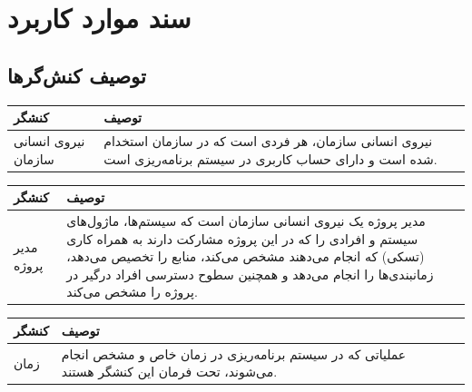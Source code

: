 
\chapter{سند موارد کاربرد}


\section{توصیف کنش‌گرها}


\begin{table}[H]
	\centering
	\begin{tabular}{|p{3cm}|p{8cm}|}
		\hline
		
		
		کنشگر	& توصیف  \\
		\hline
		
		نیروی انسانی سازمان &
		
		نیروی انسانی سازمان، هر فردی است که در سازمان استخدام شده است و دارای حساب کاربری در سیستم برنامه‌ریزی است.\\
		
		\hline
		
	\end{tabular}
\end{table}

\begin{table}[H]
	\centering
	\begin{tabular}{|p{3cm}|p{8cm}|}
		\hline
		
		
		کنشگر	& توصیف  \\
		\hline
		مدیر پروژه &
		
		مدیر پروژه یک نیروی انسانی سازمان است که سیستم‌ها، ماژول‌های سیستم و افرادی را که در این پروژه مشارکت دارند به همراه کاری (تسکی) که انجام می‌دهند مشخص می‌کند، منابع را تخصیص می‌دهد، زمانبندی‌ها را انجام می‌دهد و همچنین سطوح دسترسی افراد درگیر در پروژه را مشخص می‌کند.
		\\
		\hline
		
	\end{tabular}
\end{table}


\begin{table}[H]
	\centering
	\begin{tabular}{|p{3cm}|p{8cm}|}
		\hline
		
		
		کنشگر	& توصیف  \\
		\hline
		زمان &
		
		عملیاتی که در سیستم برنامه‌ریزی در زمان خاص و مشخص انجام می‌شوند، تحت فرمان این کنشگر هستند.
		\\
		\hline
		
	\end{tabular}
\end{table}

